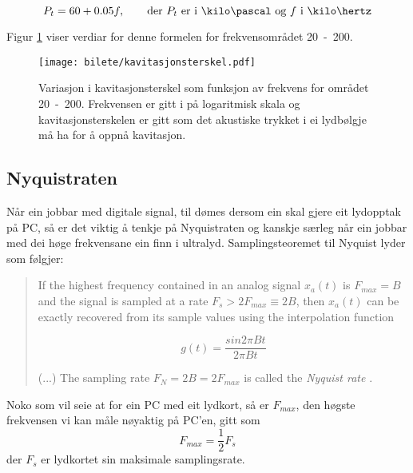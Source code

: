 \begin{equation}
	\label{kavitasjonsterskel}
	P_t = 60 + 0.05f, \qquad \text{der } P_t \text{ er i } \kilo\pascal \text{ og } f \text{ i } \kilo\hertz
\end{equation}

Figur \ref{fig:kavterskel} viser verdiar for denne formelen for frekvensområdet \unit{20 - 200}{\kilo\hertz}.

\begin{figure}[htbp]
\centering
\texttt{[image: bilete/kavitasjonsterskel.pdf]}
\caption[Variasjon i kavitasjonsterskel som funksjon av frekvens]{Variasjon i kavitasjonsterskel som funksjon av frekvens for området \unit{20 - 200}{\kilo\hertz}. Frekvensen er gitt i {\kilo\hertz} på logaritmisk skala og kavitasjonsterskelen er gitt som det akustiske trykket i {\kilo\pascal} ei lydbølgje må ha for å oppnå kavitasjon.}
\label{fig:kavterskel}
\end{figure}

\subsection{Nyquistraten}
\label{nyquist}
Når ein jobbar med digitale signal, til dømes dersom ein skal gjere eit lydopptak på PC, så er det viktig å tenkje på Nyquistraten og kanskje særleg når ein jobbar med dei høge frekvensane ein finn i ultralyd. Samplingsteoremet til Nyquist lyder som følgjer:

\begin{quote}
	If the highest frequency contained in an analog signal $x_a(t)$ is $F_{max} = B$ and the signal is sampled at a rate $F_s > 2F_{max} \equiv 2B$, then 		$x_a(t)$ can be exactly recovered from its sample values using the interpolation function

	\begin{equation}
		g(t) = \frac{sin 2\pi Bt}{2\pi Bt}
	\end{equation}

	(...) The sampling rate $F_N = 2B = 2F_{max}$ is called the \emph{Nyquist rate} \cite[s. 28]{Proakis:2006fk}.
\end{quote}

Noko som vil seie at for ein PC med eit lydkort, så er $F_{max}$, den høgste frekvensen vi kan måle nøyaktig på PC'en, gitt som
\begin{equation}
	F_{max} = \frac{1}{2}F_s
\end{equation}
der $F_s$ er lydkortet sin maksimale samplingsrate.